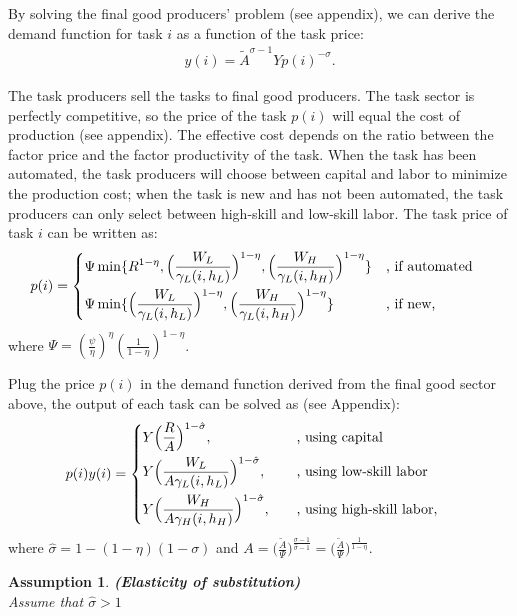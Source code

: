 \documentclass[12pt]{article}
\newtheorem{assumption}{Assumption}
\begin{document}
By solving the final good producers' problem (see appendix), we can derive the demand function for task $i$ as a function of the task price:
\begin{align*}
y(i) = \tilde{A}^{\sigma-1}Yp(i)^{-\sigma}.
\end{align*}

The task producers sell the tasks to final good producers. The task sector is perfectly competitive, so the price of the task $p(i)$ will equal the cost of production (see appendix). The effective cost depends on the ratio between the factor price and the factor productivity of the task. When the task has been automated, the task producers will choose between capital and labor to minimize the production cost; when the task is new and has not been automated, the task producers can only select between high-skill and low-skill labor. The task price of task $i$ can be written as: 
\begin{align*}
p(i) &= 
\begin{dcases}
\Psi \min\{R^{1-\eta},\Big(\frac{W_L}{\gamma_L(i,h_L)}\Big)^{1-\eta},\Big(\frac{W_H}{\gamma_L(i,h_H)}\Big)^{1-\eta}\} &\text{, if automated}  \\
\Psi \min\{\Big(\frac{W_L}{\gamma_L(i,h_L)}\Big)^{1-\eta},\Big(\frac{W_H}{\gamma_L(i,h_H)}\Big)^{1-\eta}\} &\text{, if new,}
\end{dcases}
\end{align*}
where $\Psi = (\frac{\psi}{\eta})^{\eta}(\frac{1}{1-\eta})^{1-\eta}$. 

Plug the price $p(i)$ in the demand function derived from the final good sector above, the output of each task can be solved as (see Appendix): 
\begin{align*}
p(i)y(i) &= 
\begin{dcases}
Y\Big(\frac{R}{A}\Big)^{1-\hat{\sigma}}, &\quad  \text{, using capital}  \\
Y\Big(\frac{W_L}{A\gamma_L(i,h_L)}\Big)^{1-\hat{\sigma}}, &\quad  \text{, using low-skill labor}    \\
Y\Big(\frac{W_H}{A\gamma_H(i,h_H)}\Big)^{1-\hat{\sigma}}, &\quad  \text{, using high-skill labor}, 
\end{dcases}
\end{align*}
where $\hat{\sigma} = 1-(1-\eta)(1-\sigma)$ and $A = \Big(\frac{\tilde{A}}{\Psi}\Big)^{\frac{\sigma-1}{\hat{\sigma}-1}}  = \Big(\frac{\tilde{A}}{\Psi}\Big)^{\frac{1}{1-\eta}}$.

\begin{assumption}{\bf (Elasticity of substitution)} \\

Assume that $\hat{\sigma}>1$
\end{assumption}
\end{document}
